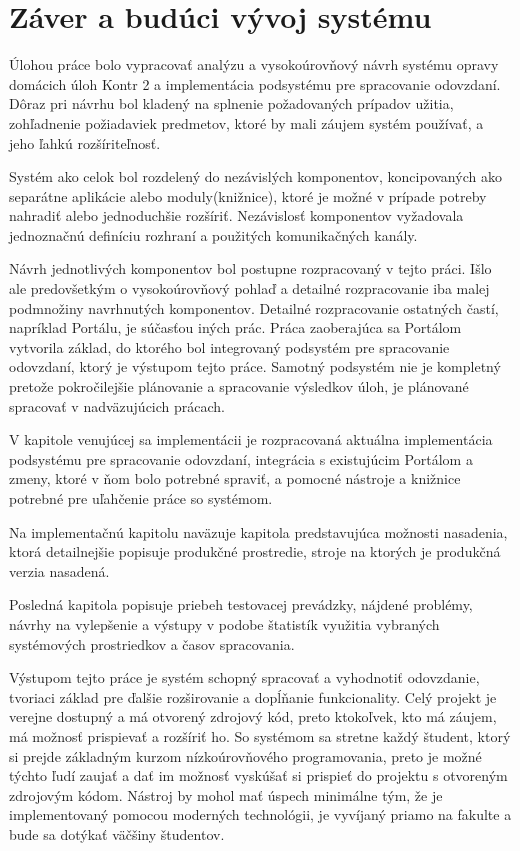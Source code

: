 \documentclass[
  digital, %
  twoside, %
  table,   %
  lof,     %
  lot,     %
]{fithesis3}
\begin{document}
\chapter{Záver a budúci vývoj systému}

Úlohou práce bolo vypracovať analýzu a vysokoúrovňový návrh systému opravy domácich úloh Kontr 2 a implementácia podsystému pre spracovanie odovzdaní. 
Dôraz pri návrhu bol kladený na splnenie požadovaných prípadov užitia, zohľadnenie požiadaviek predmetov, ktoré by mali záujem systém používať, a jeho ľahkú rozšíriteľnosť.

Systém ako celok bol rozdelený do nezávislých komponentov, koncipovaných ako separátne aplikácie alebo moduly(knižnice), ktoré je možné v prípade potreby nahradiť alebo jednoduchšie rozšíriť. Nezávislosť komponentov vyžadovala jednoznačnú definíciu rozhraní a použitých komunikačných kanály.

Návrh jednotlivých komponentov bol postupne rozpracovaný v tejto práci. Išlo ale predovšetkým o vysokoúrovňový pohlaď a detailné rozpracovanie iba malej podmnožiny navrhnutých komponentov. Detailné rozpracovanie ostatných častí, napríklad Portálu, je súčasťou iných prác. Práca zaoberajúca sa Portálom vytvorila základ, do ktorého bol integrovaný podsystém pre spracovanie odovzdaní, ktorý je výstupom tejto práce.
Samotný podsystém nie je kompletný pretože pokročilejšie plánovanie a spracovanie výsledkov úloh, je plánované spracovať v nadväzujúcich prácach.

V kapitole venujúcej sa implementácii je rozpracovaná aktuálna implementácia podsystému pre spracovanie odovzdaní, integrácia s existujúcim Portálom a zmeny, ktoré v ňom bolo potrebné spraviť, a pomocné nástroje a knižnice potrebné pre uľahčenie práce so systémom.

Na implementačnú kapitolu naväzuje kapitola predstavujúca možnosti nasadenia, ktorá detailnejšie popisuje produkčné prostredie, stroje na ktorých je produkčná verzia nasadená. 

Posledná kapitola popisuje priebeh testovacej prevádzky, nájdené problémy, návrhy na vylepšenie a výstupy v podobe štatistík využitia vybraných systémových prostriedkov a časov spracovania.

Výstupom tejto práce je systém schopný spracovať a vyhodnotiť odovzdanie, tvoriaci základ pre ďalšie rozširovanie a dopĺňanie funkcionality. Celý projekt je verejne dostupný a má otvorený zdrojový kód, preto ktokoľvek, kto má záujem, má možnosť prispievať a rozšíriť ho. So systémom sa stretne každý študent, ktorý si prejde základným kurzom nízkoúrovňového programovania, preto je možné týchto ľudí zaujať a dať im možnosť vyskúšať si prispieť do projektu s otvoreným zdrojovým kódom. 
Nástroj by mohol mať úspech minimálne tým, že je implementovaný pomocou moderných technológii, je vyvíjaný priamo na fakulte a bude sa dotýkať väčšiny študentov.
\end{document}
